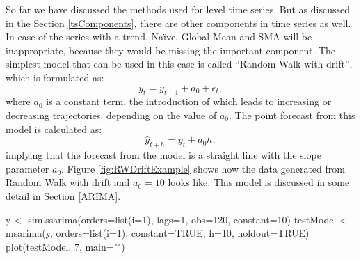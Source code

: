 \documentclass[
]{book}
\newenvironment{Shaded}{\begin{snugshade}}{\end{snugshade}}
\newcommand{\AttributeTok}[1]{\textcolor[rgb]{0.77,0.63,0.00}{#1}}
\newcommand{\ConstantTok}[1]{\textcolor[rgb]{0.00,0.00,0.00}{#1}}
\newcommand{\DecValTok}[1]{\textcolor[rgb]{0.00,0.00,0.81}{#1}}
\newcommand{\FunctionTok}[1]{\textcolor[rgb]{0.00,0.00,0.00}{#1}}
\newcommand{\NormalTok}[1]{#1}
\newcommand{\OtherTok}[1]{\textcolor[rgb]{0.56,0.35,0.01}{#1}}
\newcommand{\StringTok}[1]{\textcolor[rgb]{0.31,0.60,0.02}{#1}}
\theoremstyle{definition}
\theoremstyle{definition}
\theoremstyle{definition}
\theoremstyle{definition}
\theoremstyle{remark}
\begin{document}
So far we have discussed the methods used for level time series. But as discussed in the Section \ref{tsComponents}, there are other components in time series as well. In case of the series with a trend, Naïve, Global Mean and SMA will be inappropriate, because they would be missing the important component. The simplest model that can be used in this case is called ``Random Walk with drift'', which is formulated as:
\begin{equation}
    y_t = y_{t-1} + a_0 + \epsilon_t,
    \label{eq:RandomWalkWithDrift}
\end{equation}
where \(a_0\) is a constant term, the introduction of which leads to increasing or decreasing trajectories, depending on the value of \(a_0\). The point forecast from this model is calculated as:
\begin{equation}
    \hat{y}_{t+h} = y_{t} + a_0 h,
    \label{eq:RandomWalkWithDriftForecast}
\end{equation}
implying that the forecast from the model is a straight line with the slope parameter \(a_0\). Figure \ref{fig:RWDriftExample} shows how the data generated from Random Walk with drift and \(a_0=10\) looks like. This model is discussed in some detail in Section \ref{ARIMA}.

\begin{Shaded}
\begin{Highlighting}[]
\NormalTok{y }\OtherTok{\textless{}{-}} \FunctionTok{sim.ssarima}\NormalTok{(}\AttributeTok{orders=}\FunctionTok{list}\NormalTok{(}\AttributeTok{i=}\DecValTok{1}\NormalTok{), }\AttributeTok{lags=}\DecValTok{1}\NormalTok{, }\AttributeTok{obs=}\DecValTok{120}\NormalTok{,}
                 \AttributeTok{constant=}\DecValTok{10}\NormalTok{)}
\NormalTok{testModel }\OtherTok{\textless{}{-}} \FunctionTok{msarima}\NormalTok{(y, }\AttributeTok{orders=}\FunctionTok{list}\NormalTok{(}\AttributeTok{i=}\DecValTok{1}\NormalTok{), }\AttributeTok{constant=}\ConstantTok{TRUE}\NormalTok{,}
                     \AttributeTok{h=}\DecValTok{10}\NormalTok{, }\AttributeTok{holdout=}\ConstantTok{TRUE}\NormalTok{)}
\FunctionTok{plot}\NormalTok{(testModel, }\DecValTok{7}\NormalTok{, }\AttributeTok{main=}\StringTok{""}\NormalTok{)}
\end{Highlighting}
\end{Shaded}
\end{document}
